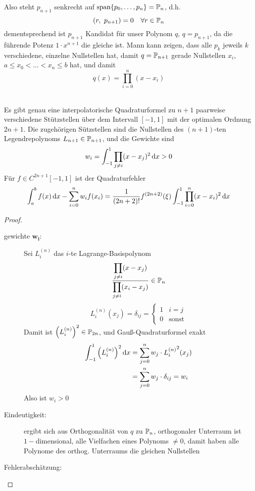 \documentclass[11pt,a4paper,oneside]{scrartcl}
\begin{document}
{
\def\scp#1#2{\ensuremath{\left(#1,\ #2\right)}}
Also steht $p_{n+1}$ senkrecht auf $\text{span\ensuremath{\left\{ p_0, \dots, p_n \right\}}} = \mathbb{P}_n$, d.h. \[
    \scp r {p_{n+1}} = 0 \largespace\forall r \in \bbP_n
    \]
    dementsprechend ist $p_{n+1}$ Kandidat für unser Polynom $q$, $q = p_{n+1}$, da
    die führende Potenz $1\cdot x^{n+1}$ die gleiche ist. Mann kann zeigen, dass alle
    $p_k$ jeweils $k$ verschiedene, einzelne Nullstellen hat, damit $q=\mathbb{P}_{n+1}$ gerade
    Nullstellen $x_i$, $a\leq x_0 < \dots < x_n \leq b$ hat, und damit \[
        q(x) = \prod_{i=0}^n(x-x_i)\]
\begin{theorem}\hfill\\
    Es gibt genau eine interpolatorische Quadraturformel zu $n+1$ paarweise verschiedene Stützstellen
    über dem Intervall $[-1, 1]$ mit der optimalen Ordnung $2n+1$. Die zugehörigen Sützstellen
    sind die Nullstellen des $(n+1)$-ten Legendrepolynoms $L_{n+1}\in \mathbb{P}_{n+1}$, und die Gewichte sind\[
        w_i = \int_{-1}^1 \prod_{j\neq i}(x-x_j)^2 \mathop{}\!\mathrm{d} x > 0\]
    Für $f\in C^{2n+1}[-1,1]$ ist der Quadraturfehler \[
        \int_a^b f(x)\mathop{}\!\mathrm{d} x - \sum_{i=0}^n w_if(x_i) = \frac{1}{(2n+2)!}f^{(2n+2)}(\xi)\int_{-1}^1\prod_{i=0}^n(x-x_i)^2\mathop{}\!\mathrm{d} x\]
\end{theorem}
\def\LgBp#1#2{\ensuremath{L_{#1}^{(#2)}}}
\begin{proof}
    \begin{description}
        \item[gewichte $\mathbf{w_i}$:]
         Sei $L_i^{(n)}$ das $i$-te Lagrange-Basispolynom \[
        \frac{\dprod_{j\neq i}(x-x_j)}{\dprod_{j\neq i}(x_i-x_j)}\in\Pol{n}\]
    \[L^{(n)}_i(x_j) = \delta_{ij} = \begin{cases}
        1 & i=j\\0&\text{sonst}
    \end{cases}\] Damit ist $\left(L_i^{(n)}\right)^2 \in \Pol{2n}$, und Gauß-Quadraturformel exakt\begin{align*}
        \int_{-1}^1 \left(L_i^{(n)}\right)^2 \diff x &= \sum_{j=0}^n w_j\cdot  {\LgBp{i}{n}}^2(x_j) \\
        &= \sum_{j=0}^n w_j \cdot \delta_{ij} = w_i
    \end{align*}
    Also ist $w_i > 0$
    \item[Eindeutigkeit:]
    ergibt sich aus Orthogonalität von $q$ zu $\Pol{n}$, orthogonaler Unterraum ist $1-$dimensional,
    alle Vielfachen eines Polynoms $\neq 0$, damit haben alle Polynome des orthog. Unterraums
    die gleichen Nullstellen
    \item[Fehlerabschätzung:]

\end{description}
\end{proof}}
\end{document}
